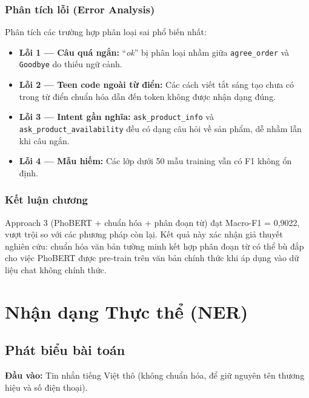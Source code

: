 \documentclass[12pt, a4paper]{report}
\begin{document}
\subsection{Phân tích lỗi (Error Analysis)}

Phân tích các trường hợp phân loại sai phổ biến nhất:

\begin{itemize}
  \item \textbf{Lỗi 1 — Câu quá ngắn:}
        ``\textit{ok}'' bị phân loại nhầm giữa \texttt{agree\_order}
        và \texttt{Goodbye} do thiếu ngữ cảnh.
  \item \textbf{Lỗi 2 — Teen code ngoài từ điển:}
        Các cách viết tắt sáng tạo chưa có trong từ điển chuẩn hóa
        dẫn đến token không được nhận dạng đúng.
  \item \textbf{Lỗi 3 — Intent gần nghĩa:}
        \texttt{ask\_product\_info} và \texttt{ask\_product\_availability}
        đều có dạng câu hỏi về sản phẩm, dễ nhầm lẫn khi câu ngắn.
  \item \textbf{Lỗi 4 — Mẫu hiếm:}
        Các lớp dưới 50 mẫu training vẫn có F1 không ổn định.
\end{itemize}

\subsection{Kết luận chương}

Approach 3 (PhoBERT + chuẩn hóa + phân đoạn từ) đạt Macro-F1 = 0,9022,
vượt trội so với các phương pháp còn lại.
Kết quả này xác nhận giả thuyết nghiên cứu: chuẩn hóa văn bản tường minh
kết hợp phân đoạn từ có thể bù đắp cho việc PhoBERT được pre-train
trên văn bản chính thức khi áp dụng vào dữ liệu chat không chính thức.

\chapter{Nhận dạng Thực thể (NER)}

\section{Phát biểu bài toán}

\textbf{Đầu vào:} Tin nhắn tiếng Việt thô (không chuẩn hóa, để giữ nguyên
tên thương hiệu và số điện thoại).
\end{document}
